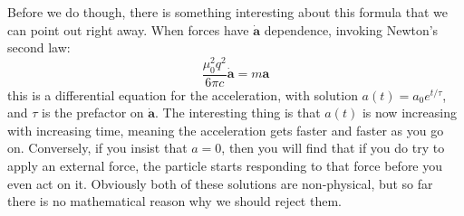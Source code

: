 Before we do though, there is something interesting about this formula that we can point out right away. When
forces have \( \dot{\mathbf{a}} \) dependence, invoking Newton's second law:
\[
	\frac{\mu_0^2 q^2}{6 \pi c} \dot{\mathbf{a}} = m \mathbf{a}
\]
this is a differential equation for the acceleration, with solution \( a(t) = a_0 e^{t / \tau} \), and \(
\tau \) is the prefactor on \( \dot{\mathbf{a}} \). The interesting thing is that \( a(t) \) is now increasing
with increasing time, meaning the acceleration gets faster and faster as you go on. Conversely, if you insist
that \( a = 0 \), then you will find that if you do try to apply an external force, the particle starts
responding to that force before you even act on it. Obviously both of these solutions are non-physical, but so
far there is no mathematical reason why we should reject them. 

